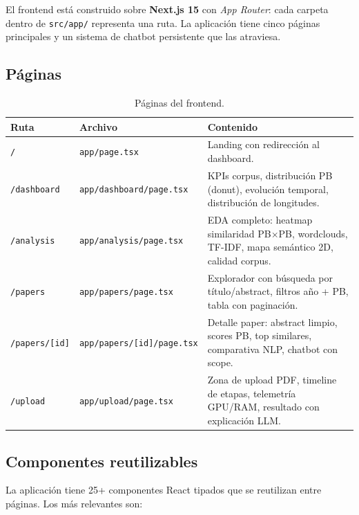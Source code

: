 \documentclass[11pt,a4paper]{article}
\newcommand{\tech}[1]{\textbf{\textcolor{accent}{#1}}}
\newcommand{\file}[1]{\texttt{\small #1}}
\begin{document}
El frontend está construido sobre \tech{Next.js 15} con \emph{App Router}: cada carpeta dentro de \file{src/app/} representa una ruta. La aplicación tiene cinco páginas principales y un sistema de chatbot persistente que las atraviesa.

\subsection{Páginas}

\begin{table}[h]
\centering\small
\begin{tabularx}{\linewidth}{l l X}
\toprule
\textbf{Ruta} & \textbf{Archivo} & \textbf{Contenido} \\
\midrule
\texttt{/} & \file{app/page.tsx} & Landing con redirección al dashboard. \\
\texttt{/dashboard} & \file{app/dashboard/page.tsx} & KPIs corpus, distribución PB (donut), evolución temporal, distribución de longitudes. \\
\texttt{/analysis} & \file{app/analysis/page.tsx} & EDA completo: heatmap similaridad PB$\times$PB, wordclouds, TF-IDF, mapa semántico 2D, calidad corpus. \\
\texttt{/papers} & \file{app/papers/page.tsx} & Explorador con búsqueda por título/abstract, filtros año + PB, tabla con paginación. \\
\texttt{/papers/[id]} & \file{app/papers/[id]/page.tsx} & Detalle paper: abstract limpio, scores PB, top similares, comparativa NLP, chatbot con scope. \\
\texttt{/upload} & \file{app/upload/page.tsx} & Zona de upload PDF, timeline de etapas, telemetría GPU/RAM, resultado con explicación LLM. \\
\bottomrule
\end{tabularx}
\caption{Páginas del frontend.}
\end{table}

\subsection{Componentes reutilizables}

La aplicación tiene 25+ componentes React tipados que se reutilizan entre páginas. Los más relevantes son:
\end{document}

